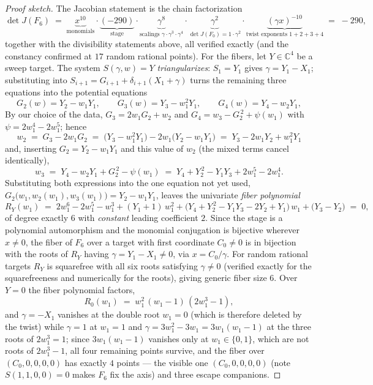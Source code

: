 \documentclass[11pt]{article}
\theoremstyle{plain}
\theoremstyle{definition}
\theoremstyle{remark}
\newcommand{\C}{\mathbb{C}}
\begin{document}
\begin{proof}[Proof sketch]
The Jacobian statement is the chain factorization
\[
\det J(F_6)\;=\;
\underbrace{x^{10}}_{\text{monomials}}\cdot
\underbrace{(-290)}_{\text{stage}}\cdot
\underbrace{\gamma^{8}}_{\text{scalings }\gamma\cdot\gamma^3\cdot\gamma^4}\cdot
\underbrace{\gamma^{2}}_{\det J(F_0)=1\cdot\gamma^2}\cdot
\underbrace{(\gamma x)^{-10}}_{\text{twist exponents }1+2+3+4}
\;=\;-290 ,
\]
together with the divisibility statements above, all verified exactly (and the
constancy confirmed at $17$ random rational points). For the fibers, let
$Y\in\C^4$ be a sweep target. The system $S(\gamma,w)=Y$ \emph{triangularizes}:
$S_1=Y_1$ gives $\gamma=Y_1-X_1$; substituting into
$S_{i+1}=G_{i+1}+\delta_{i+1}(X_1+\gamma)$ turns the remaining three equations
into the potential equations
\[
G_2(w)=Y_2-w_1Y_1,\qquad G_3(w)=Y_3-w_1^2Y_1,\qquad G_4(w)=Y_4-w_2Y_1 ,
\]
By our choice of the data, $G_3=2w_1G_2+w_2$ and
$G_4=w_3-G_2^{\,2}+\psi(w_1)$ with $\psi=2w_1^4-2w_1^5$; hence
\[
w_2\;=\;G_3-2w_1G_2\;=\;\bigl(Y_3-w_1^2Y_1\bigr)-2w_1\bigl(Y_2-w_1Y_1\bigr)
\;=\;Y_3-2w_1Y_2+w_1^2Y_1
\]
and, inserting $G_2=Y_2-w_1Y_1$ and this value of $w_2$ (the mixed terms
cancel identically),
\[
w_3\;=\;Y_4-w_2Y_1+G_2^{\,2}-\psi(w_1)
\;=\;Y_4+Y_2^{\,2}-Y_1Y_3+2w_1^5-2w_1^4 .
\]
Substituting both expressions into the one equation not yet used,
$G_2\bigl(w_1,w_2(w_1),w_3(w_1)\bigr)=Y_2-w_1Y_1$, leaves the univariate \emph{fiber polynomial}
\[
R_Y(w_1)\;=\;2w_1^6-2w_1^5-w_1^3+(Y_1+1)\,w_1^2
+\bigl(Y_4+Y_2^{\,2}-Y_1Y_3-2Y_2+Y_1\bigr)\,w_1+\bigl(Y_3-Y_2\bigr)\;=\;0 ,
\]
of degree exactly $6$ with \emph{constant} leading coefficient $2$. Since the
stage is a polynomial automorphism and the monomial conjugation is bijective
wherever $x\neq0$, the fiber of $F_6$ over a target with first coordinate
$C_0\neq0$ is in bijection with the roots of $R_Y$ having $\gamma=Y_1-X_1\neq0$,
via $x=C_0/\gamma$. For random rational targets $R_Y$ is squarefree with all
six roots satisfying $\gamma\neq0$ (verified exactly for the squarefreeness and
numerically for the roots), giving generic fiber size $6$. Over
$Y=0$ the fiber polynomial factors,
\[
R_0(w_1)\;=\;w_1^2\,(w_1-1)\,(2w_1^3-1),
\]
and $\gamma=-X_1$ vanishes at the double root $w_1=0$ (which is therefore
deleted by the twist) while $\gamma=1$ at $w_1=1$ and
$\gamma=3w_1^2-3w_1=3w_1(w_1-1)$ at the three roots of $2w_1^3=1$; since
$3w_1(w_1-1)$ vanishes only at $w_1\in\{0,1\}$, which are not roots of
$2w_1^3-1$, all four remaining points survive, and the fiber over
$(C_0,0,0,0,0)$ has exactly $4$ points --- the visible one
$(C_0,0,0,0,0)$ (note $S(1,1,0,0)=0$ makes $F_6$ fix the axis) and three
escape companions.
\end{proof}
\end{document}
